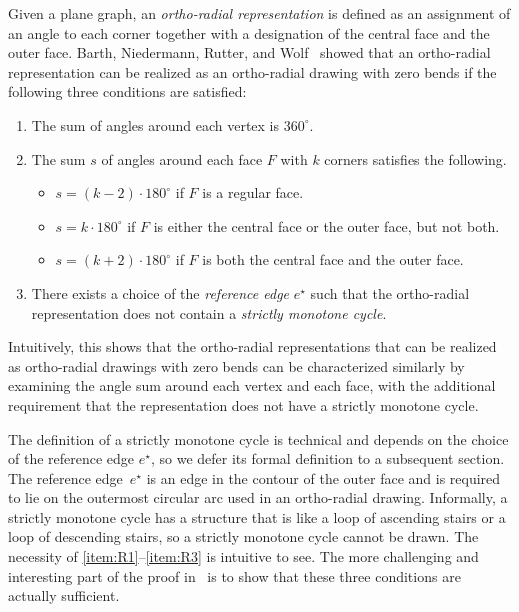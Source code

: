 \documentclass{article}\usepackage[a4paper,margin=20mm]{geometry}
\newcommand{\eref}{e^\star}
\begin{document}
Given a plane graph, an \emph{ortho-radial representation} is defined as an assignment of an angle to each corner together with a designation of the central face and the outer face.
Barth, Niedermann, Rutter, and Wolf~\cite{barth2023topology}  showed that an ortho-radial representation can be realized as an ortho-radial drawing with zero bends if the  following three conditions are satisfied:
\begin{enumerate}[(R1)]
    \item \label{item:R1} The sum of angles around each vertex is $360^\circ$.
    \item \label{item:R2} The sum $s$ of angles around each face $F$ with $k$ corners satisfies the following.
    \begin{itemize}
        \item $s = (k-2)\cdot 180^\circ$ if $F$ is a regular face.
        \item $s = k\cdot 180^\circ$ if $F$ is either the central face or the outer face, but not both.
        \item $s = (k+2) \cdot 180^\circ$ if $F$ is both the central face and the outer face.
    \end{itemize}
    \item \label{item:R3}There exists a choice of the \emph{reference edge} $\eref$ such that the ortho-radial representation does not contain a \emph{strictly monotone cycle}.
\end{enumerate}

Intuitively, this shows that the ortho-radial representations that can be realized as ortho-radial drawings with zero bends can be characterized similarly by examining the angle sum around each vertex and each face, with the additional requirement that the representation does not have a strictly monotone cycle. 


The definition of a strictly monotone cycle is  technical and depends on the choice of the reference edge $\eref$, so we defer its formal definition to a subsequent section. 
The reference edge~$\eref$ is an edge in the contour of the outer face and is required to lie on the outermost circular arc used in an ortho-radial drawing. 
Informally, a strictly monotone cycle has a structure that is like a loop of ascending stairs or a loop of descending stairs, so a strictly monotone cycle cannot be drawn. The necessity of \ref{item:R1}--\ref{item:R3} is intuitive to see. The more challenging and interesting part of the proof in~\cite{barth2023topology} is to show that these three conditions are actually sufficient.
\end{document}
